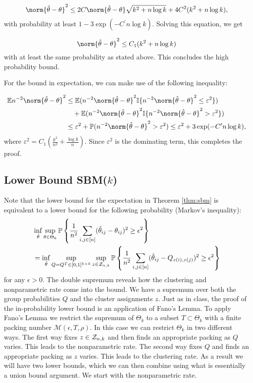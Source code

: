 \documentclass[11pt]{article}
\begin{document}
\[
\norm{\htheta-\theta}^2 \leq 2C\norm{\htheta - \theta}\sqrt{k^2 +n \log k} + 4C^2(k^2 +n\log k),
\]
with probability at least $1-3\exp(-C^\prime n\log k)$. Solving this equation, we get

\[ \norm{\htheta-\theta}^2 \leq C_1 (k^2 + n\log k ) \]
with at least the same probability as stated above. This concludes the high probability bound.

For the bound in expectation, we can make use of the following inequality:

\begin{align*}
    \mathbb{E}n^{-2}\norm{\htheta-\theta}^2 & \leq \mathbb{E}(n^{-2}\norm{\htheta-\theta}^2 \mathbb{I}\set{n^{-2}\norm{\htheta-\theta}^2 \leq \varepsilon^2} ) \\
    & \quad + \mathbb{E}(n^{-2}\norm{\htheta-\theta}^2 \mathbb{I}\set{n^{-2}\norm{\htheta-\theta}^2 > \varepsilon^2} ) \\
    & \leq \varepsilon^2 + \mathbb{P}(n^{-2}\norm{\htheta-\theta}^2 > \varepsilon^2) \leq \varepsilon^2 + 3\exp(-C^\prime n\log k),
\end{align*}
where $\varepsilon^2 = C_1(\frac{k^2}{n^2}+ \frac{\log k}{n})$. Since $\varepsilon^2$ is the dominating term, this completes the proof.

\subsection{Lower Bound SBM($k$)} \label{sec:lower_sbm}
Note that the lower bound for the expectation in Theorem \ref{thm:sbm} is equivalent to a lower bound for the following probability (Markov's inequality):
\begin{equation}
\begin{aligned}
&\inf_{\hat{\theta}} \sup_{\theta \in \Theta_k} \mathbb{P} \left\{ \frac{1}{n^2}\sum_{i,j \in \lbrack n\rbrack} (\hat{\theta}_{ij} - \theta_{ij})^2 \geq \epsilon^2\right\}  \\
&= \inf_{\hat{\theta}} \sup_{Q = Q^T \in [0, 1]^{k \times k}} \sup_{z \in \mathcal{Z}_{n,k}} \mathbb{P} \left\{ \frac{1}{n^2}\sum_{i,j \in \lbrack n\rbrack} (\hat{\theta}_{ij} - Q_{z(i), z(j)})^2 \geq \epsilon^2\right\}
\end{aligned}
\end{equation}
for any $\epsilon > 0$. The double supremum reveals how the clustering and nonparametric rate come into the bound. We have a supremum over both the group probabilities $Q$ and the cluster assignments $z$. Just as in class, the proof of the in-probability lower bound is an application of Fano's Lemma. To apply Fano's Lemma we restrict the supremum of $\Theta_k$ to a subset $T \subset \Theta_k$ with a finite packing number $\mathcal{M}(\epsilon, T, \rho)$. In this case we can restrict $\Theta_k$ in two different ways. The first way fixes $z \in \mathcal{Z}_{n,k}$ and then finds an appropriate packing as $Q$ varies. This leads to the nonparametric rate. The second way fixes $Q$ and finds an appropriate packing as $z$ varies. This leads to the clustering rate. As a result we will have two lower bounds, which we can then combine using what is essentially a union bound argument. We start with the nonparametric rate.
\end{document}
